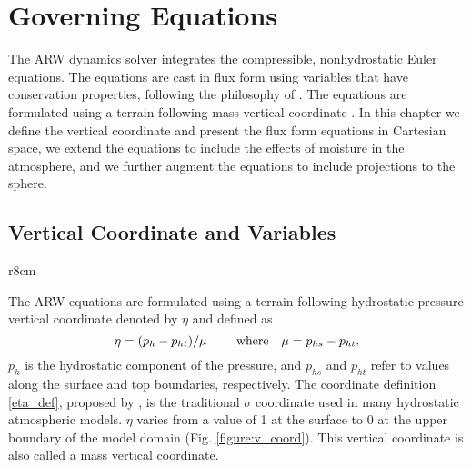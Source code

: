 \chapter{Governing Equations}
\label{equation_chap}

The ARW dynamics solver integrates the compressible, nonhydrostatic
Euler equations.  The equations are cast in flux form using variables
that have conservation properties, following the philosophy of \citet{ooyama90}.
The equations are formulated using a terrain-following mass
vertical coordinate \citep{laprise92}.  In this chapter we define
the vertical coordinate and present the flux form equations in Cartesian
space, we extend the equations to include the effects of moisture in the
atmosphere, and we further augment the equations to include
projections to the sphere.

\section{Vertical Coordinate and Variables}

%
%


\begin{wrapfigure}{r}{8cm}
\mbox{
}
\caption{\label{figure:v_coord}ARW $\eta$ coordinate.}
\end{wrapfigure}
The ARW equations are formulated using a terrain-following
hydrostatic-pressure vertical coordinate denoted by $\eta$ and defined as
%
\begin{equation}
\eta = (p_h-p_{ht})/\mu ~~~~~~~{\rm where
                              }~~~ \mu = p_{hs}-p_{ht}.
\label{eta_def}
\end{equation}
\noindent $p_h$ is the hydrostatic component of the pressure, and
$p_{hs}$ and $p_{ht}$ refer to values along the surface and top
boundaries, respectively. The coordinate definition \eqref{eta_def},
proposed by \citet{laprise92}, 
is the traditional $\sigma$ coordinate used
in many hydrostatic atmospheric models.  $\eta$ varies from a value of 1
at the surface to 0 at the upper boundary of the model domain (Fig. \ref{figure:v_coord}).
This vertical coordinate is also called a mass vertical coordinate. 

